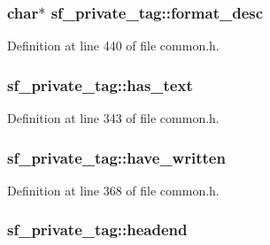 \subsubsection[{\texorpdfstring{format\+\_\+desc}{format_desc}}]{\setlength{\rightskip}{0pt plus 5cm}char$\ast$ sf\+\_\+private\+\_\+tag\+::format\+\_\+desc}\hypertarget{structsf__private__tag_aef35e722baee8cdfb2eac1c3417464eb}{}\label{structsf__private__tag_aef35e722baee8cdfb2eac1c3417464eb}


Definition at line 440 of file common.\+h.

\subsubsection[{\texorpdfstring{has\+\_\+text}{has_text}}]{ sf\+\_\+private\+\_\+tag\+::has\+\_\+text}\hypertarget{structsf__private__tag_a2c96442834399ed2dbeefa84bfb87bd3}{}\label{structsf__private__tag_a2c96442834399ed2dbeefa84bfb87bd3}


Definition at line 343 of file common.\+h.

\subsubsection[{\texorpdfstring{have\+\_\+written}{have_written}}]{ sf\+\_\+private\+\_\+tag\+::have\+\_\+written}\hypertarget{structsf__private__tag_ac6a5ca05f37ab57aa894027ebe7b587b}{}\label{structsf__private__tag_ac6a5ca05f37ab57aa894027ebe7b587b}


Definition at line 368 of file common.\+h.

\subsubsection[{\texorpdfstring{headend}{headend}}]{ sf\+\_\+private\+\_\+tag\+::headend}\hypertarget{structsf__private__tag_a5e926176f94be21571cd6aef3eff7ac0}{}\label{structsf__private__tag_a5e926176f94be21571cd6aef3eff7ac0}


